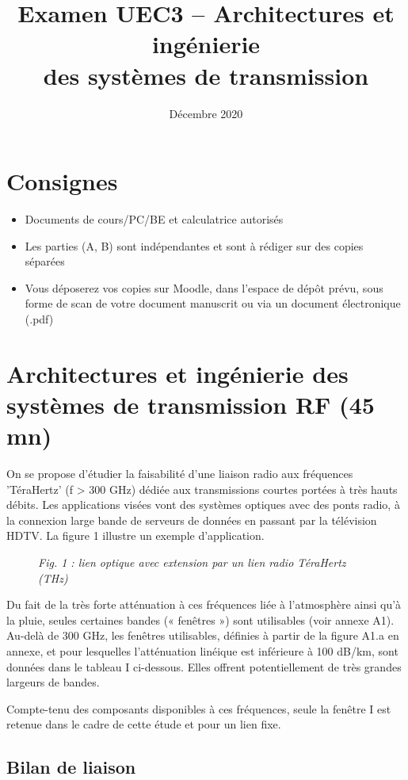 \documentclass[a4paper,11pt]{article}
\title{\textbf{Examen UEC3 -- Architectures et ingénierie\\des systèmes de transmission}}
\author{Décembre 2020}
\date{}
\begin{document}
\maketitle

\section*{Consignes}
\begin{itemize}
    \item Documents de cours/PC/BE et calculatrice autorisés
    \item Les parties (A, B) sont indépendantes et sont à rédiger sur des copies séparées
    \item Vous déposerez vos copies sur Moodle, dans l'espace de dépôt prévu, sous forme de scan de votre document manuscrit ou via un document électronique (.pdf)
\end{itemize}

\section{Architectures et ingénierie des systèmes de transmission RF (45 mn)}

On se propose d'étudier la faisabilité d'une liaison radio aux fréquences 'TéraHertz' (f > 300 GHz) dédiée aux transmissions courtes portées à très hauts débits. Les applications visées vont des systèmes optiques avec des ponts radio, à la connexion large bande de serveurs de données en passant par la télévision HDTV. La figure 1 illustre un exemple d'application.

\begin{figure}[h]
    \centering
    \textit{Fig. 1 : lien optique avec extension par un lien radio TéraHertz (THz)}
\end{figure}

Du fait de la très forte atténuation à ces fréquences liée à l'atmosphère ainsi qu'à la pluie, seules certaines bandes (« fenêtres ») sont utilisables (voir annexe A1). Au-delà de 300 GHz, les fenêtres utilisables, définies à partir de la figure A1.a en annexe, et pour lesquelles l'atténuation linéique est inférieure à 100 dB/km, sont données dans le tableau I ci-dessous. Elles offrent potentiellement de très grandes largeurs de bandes.

Compte-tenu des composants disponibles à ces fréquences, seule la fenêtre I est retenue dans le cadre de cette étude et pour un lien fixe.

\subsection{Bilan de liaison}
\end{document}
